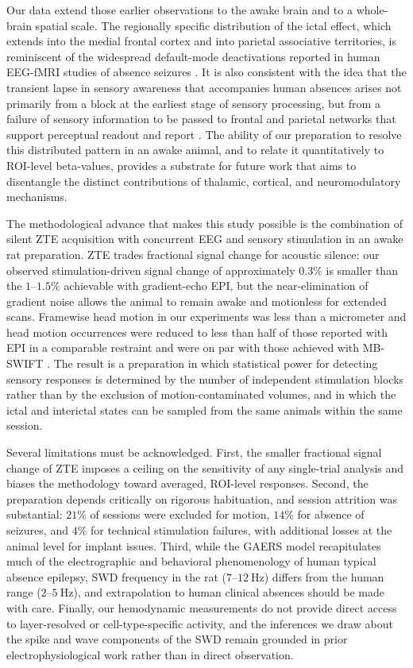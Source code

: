 \documentclass[11pt]{article}
\begin{document}
Our data extend those earlier observations to the awake brain and to a whole-brain spatial scale. The regionally specific distribution of the ictal effect, which extends into the medial frontal cortex and into parietal associative territories, is reminiscent of the widespread default-mode deactivations reported in human EEG-fMRI studies of absence seizures \citep{gotman2005,moeller2008,tenney2014}. It is also consistent with the idea that the transient lapse in sensory awareness that accompanies human absences arises not primarily from a block at the earliest stage of sensory processing, but from a failure of sensory information to be passed to frontal and parietal networks that support perceptual readout and report \citep{blumenfeld2012,ferri2025}. The ability of our preparation to resolve this distributed pattern in an awake animal, and to relate it quantitatively to ROI-level beta-values, provides a substrate for future work that aims to disentangle the distinct contributions of thalamic, cortical, and neuromodulatory mechanisms.

The methodological advance that makes this study possible is the combination of silent ZTE acquisition with concurrent EEG and sensory stimulation in an awake rat preparation. ZTE trades fractional signal change for acoustic silence: our observed stimulation-driven signal change of approximately $0.3\%$ is smaller than the $1$--$1.5\%$ achievable with gradient-echo EPI, but the near-elimination of gradient noise allows the animal to remain awake and motionless for extended scans. Framewise head motion in our experiments was less than a micrometer and head motion occurrences were reduced to less than half of those reported with EPI in a comparable restraint \citep{stenroos2018} and were on par with those achieved with MB-SWIFT \citep{paasonen2020}. The result is a preparation in which statistical power for detecting sensory responses is determined by the number of independent stimulation blocks rather than by the exclusion of motion-contaminated volumes, and in which the ictal and interictal states can be sampled from the same animals within the same session.

Several limitations must be acknowledged. First, the smaller fractional signal change of ZTE imposes a ceiling on the sensitivity of any single-trial analysis and biases the methodology toward averaged, ROI-level responses. Second, the preparation depends critically on rigorous habituation, and session attrition was substantial: $21\%$ of sessions were excluded for motion, $14\%$ for absence of seizures, and $4\%$ for technical stimulation failures, with additional losses at the animal level for implant issues. Third, while the GAERS model recapitulates much of the electrographic and behavioral phenomenology of human typical absence epilepsy, SWD frequency in the rat ($7$--$12~\si{\hertz}$) differs from the human range ($2$--$5~\si{\hertz}$), and extrapolation to human clinical absences should be made with care. Finally, our hemodynamic measurements do not provide direct access to layer-resolved or cell-type-specific activity, and the inferences we draw about the spike and wave components of the SWD remain grounded in prior electrophysiological work rather than in direct observation.
\end{document}
